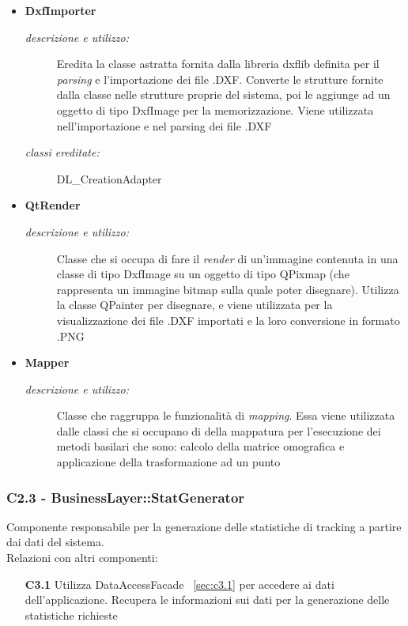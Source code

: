 \begin{itemize}
\begin{description}
\end{description}
\item \textbf{DxfImporter}
\begin{description}
\item [\textit{descrizione e utilizzo:}] Eredita la classe astratta fornita dalla libreria dxflib definita per il \textit{parsing} e l'importazione dei file .DXF. Converte le strutture fornite dalla classe nelle strutture proprie del sistema, poi le aggiunge ad un oggetto di tipo DxfImage per la memorizzazione. Viene utilizzata nell'importazione e nel parsing dei file .DXF
\item [\textit{classi ereditate:}] DL_CreationAdapter
\end{description}
\item \textbf{QtRender}
\begin{description}
\item [\textit{descrizione e utilizzo:}] Classe che si occupa di fare il \textit{render} di un'immagine contenuta in una classe di tipo DxfImage su un oggetto di tipo QPixmap (che rappresenta un immagine bitmap sulla quale poter disegnare). Utilizza la classe QPainter per disegnare, e viene utilizzata per la visualizzazione dei file .DXF importati e la loro conversione in formato .PNG
\end{description}
\item \textbf{Mapper}
\begin{description}
\item [\textit{descrizione e utilizzo:}] Classe che raggruppa le funzionalità di \textit{mapping}. Essa viene utilizzata dalle classi che si occupano di della mappatura per l'esecuzione dei metodi basilari che  sono: calcolo della matrice omografica e applicazione della trasformazione ad un punto
\end{description}
\end{itemize}

\subsubsection{C2.3 - BusinessLayer::StatGenerator} \label{sec:c2.3}
Componente responsabile per la generazione delle statistiche di tracking a partire dai dati del sistema. \\
Relazioni con altri componenti: 
\begin{itemize} 
\item [\textbf{C3.1}]
Utilizza DataAccessFacade ~\ref{sec:c3.1} per accedere ai dati dell'applicazione. Recupera le informazioni sui dati per la generazione delle statistiche richieste 
\end{itemize} 

